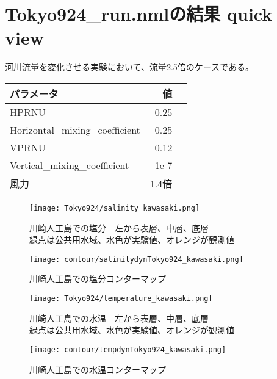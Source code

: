 \documentclass[fontsize=12pt,paper=a4]{jlreq}
\begin{document}
\section{Tokyo924\_run.nmlの結果 quick view}
河川流量を変化させる実験において、流量2.5倍のケースである。

\begin{table}
  \begin{minipage}[hbtp]{0.5\hsize}
    \begin{tabular}{lrr} \toprule
      パラメータ & 値 \\ \midrule
      HPRNU & 0.25\\
      Horizontal\_mixing\_coefficient & 0.25\\
      VPRNU & 0.12\\
      Vertical\_mixing\_coefficient & 1e-7\\
      風力 & 1.4倍\\ \bottomrule
    \end{tabular}
  \end{minipage}
\end{table}

\begin{figure}[hbtp]
        \centering
        \texttt{[image: Tokyo924/salinity\_kawasaki.png]}
        \caption{川崎人工島での塩分　左から表層、中層、底層\\緑点は公共用水域、水色が実験値、オレンジが観測値}
\end{figure}

\begin{figure}[hbtp]
        \centering
        \texttt{[image: contour/salinitydynTokyo924\_kawasaki.png]}
        \caption{川崎人工島での塩分コンターマップ}
\end{figure}


\begin{figure}[hbtp]
        \centering
        \texttt{[image: Tokyo924/temperature\_kawasaki.png]}
        \caption{川崎人工島での水温　左から表層、中層、底層\\緑点は公共用水域、水色が実験値、オレンジが観測値}
\end{figure}

\begin{figure}[hbtp]
    \centering
    \texttt{[image: contour/tempdynTokyo924\_kawasaki.png]}
    \caption{川崎人工島での水温コンターマップ}
\end{figure}
\end{document}
